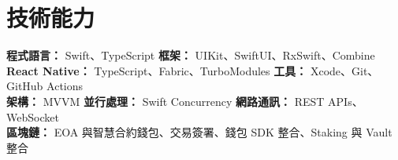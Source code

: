 \section{技術能力}
\textbf{程式語言：} Swift、TypeScript \quad
\textbf{框架：} UIKit、SwiftUI、RxSwift、Combine\\
\textbf{React Native：} TypeScript、Fabric、TurboModules \quad
\textbf{工具：} Xcode、Git、GitHub Actions\\
\textbf{架構：} MVVM \quad
\textbf{並行處理：} Swift Concurrency \quad
\textbf{網路通訊：} REST APIs、WebSocket\\
\textbf{區塊鏈：} EOA 與智慧合約錢包、交易簽署、錢包 SDK 整合、Staking 與 Vault 整合
